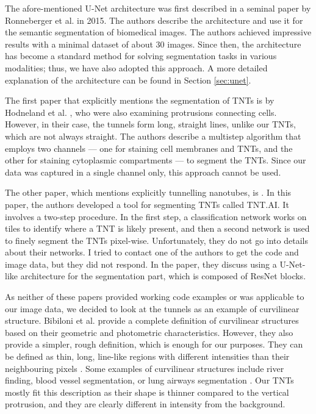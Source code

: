 \documentclass[
  digital,     %
  oneside,     %
  nosansbold,  %
  nocolorbold, %
  lof,         %
  lot,         %
]{fithesis4}
\begin{document}
The afore-mentioned U-Net architecture was first described in a seminal paper by Ronneberger et al. \parencite{Ronneberger2015} in 2015. The authors describe the architecture and use it for the semantic segmentation of biomedical images. The authors achieved impressive results with a minimal dataset of about 30 images. Since then, the architecture has become a standard method for solving segmentation tasks in various modalities; thus, we have also adopted this approach. A more detailed explanation of the architecture can be found in Section \ref{sec:unet}.


The first paper that explicitly mentions the segmentation of TNTs is by Hodneland et al. \parencite{Hodneland2006Automated}, who were also examining protrusions connecting cells. However, in their case, the tunnels form long, straight lines, unlike our TNTs, which are not always straight. The authors describe a multistep algorithm that employs two channels — one for staining cell membranes and TNTs, and the other for staining cytoplasmic compartments — to segment the TNTs. Since our data was captured in a single channel only, this approach cannot be used.

The other paper, which mentions explicitly tunnelling nanotubes, is \parencite{Ceran2022TNTdetect}. In this paper, the authors developed a tool for segmenting TNTs called TNT.AI. It involves a two-step procedure. In the first step, a classification network works on tiles to identify where a TNT is likely present, and then a second network is used to finely segment the TNTs pixel-wise. Unfortunately, they do not go into details about their networks. I tried to contact one of the authors to get the code and image data, but they did not respond. In the paper, they discuss using a U-Net-like architecture for the segmentation part, which is composed of ResNet blocks. 

As neither of these papers provided working code examples or was applicable to our image data, we decided to look at the tunnels as an example of curvilinear structure. Bibiloni et al. \parencite{bibiloni2016curvilinear} provide a complete definition of curvilinear structures based on their geometric and photometric characteristics. However, they also provide a simpler, rough definition, which is enough for our purposes. They can be defined as thin, long, line-like regions with different intensities than their neighbouring pixels \parencite{bibiloni2016curvilinear}. Some examples of curvilinear structures include river finding, blood vessel segmentation, or lung airways segmentation \parencite{kong2018roadsensing, Mou2021}. Our TNTs mostly fit this description as their shape is thinner compared to the vertical protrusion, and they are clearly different in intensity from the background.
\end{document}
